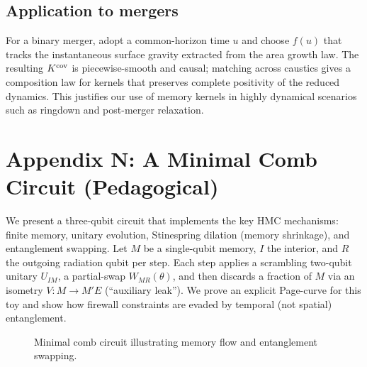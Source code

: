 \documentclass[11pt,a4paper]{article}
\theoremstyle{plain}
\theoremstyle{definition}
\theoremstyle{remark}
\begin{document}
\subsection*{Application to mergers}
For a binary merger, adopt a common-horizon time $u$ and choose $f(u)$ that tracks the instantaneous surface gravity extracted from the area growth law. The resulting $K^{\rm cov}$ is piecewise-smooth and causal; matching across caustics gives a composition law for kernels that preserves complete positivity of the reduced dynamics. This justifies our use of memory kernels in highly dynamical scenarios such as ringdown and post-merger relaxation.

\section{Appendix N: A Minimal Comb Circuit (Pedagogical)}
\label{app:minicomb}
We present a three-qubit circuit that implements the key HMC mechanisms: finite memory, unitary evolution, Stinespring dilation (memory shrinkage), and entanglement swapping.
Let $M$ be a single-qubit memory, $I$ the interior, and $R$ the outgoing radiation qubit per step.
Each step applies a scrambling two-qubit unitary $U_{IM}$, a partial-swap $W_{MR}(\theta)$, and then discards a fraction of $M$ via an isometry $V:M\!\to\!M'\!E$ (``auxiliary leak'').
We prove an explicit Page-curve for this toy and show how firewall constraints are evaded by temporal (not spatial) entanglement.
\begin{figure}[ht]
\centering
{}
\caption{Minimal comb circuit illustrating memory flow and entanglement swapping.}
\label{fig:minicomb_circuit}
\end{figure}
\end{document}
